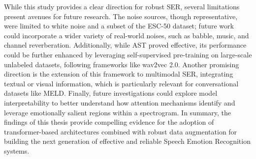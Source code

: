 While this study provides a clear direction for robust SER, several limitations present avenues for future research. The noise sources, though representative, were limited to white noise and a subset of the ESC-50 dataset; future work could incorporate a wider variety of real-world noises, such as babble, music, and channel reverberation. Additionally, while AST proved effective, its performance could be further enhanced by leveraging self-supervised pre-training on large-scale unlabeled datasets, following frameworks like wav2vec 2.0. Another promising direction is the extension of this framework to multimodal SER, integrating textual or visual information, which is particularly relevant for conversational datasets like MELD. Finally, future investigations could explore model interpretability to better understand how attention mechanisms identify and leverage emotionally salient regions within a spectrogram. In summary, the findings of this thesis provide compelling evidence for the adoption of transformer-based architectures combined with robust data augmentation for building the next generation of effective and reliable Speech Emotion Recognition systems.